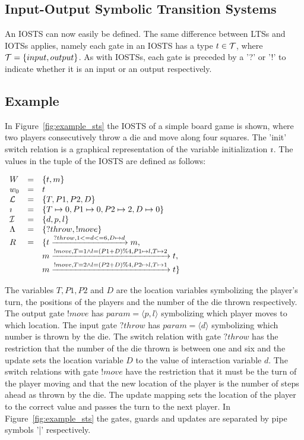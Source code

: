 \subsection{Input-Output Symbolic Transition Systems}
An IOSTS can now easily be defined. The same difference between LTSs and IOTSs applies, namely each gate in an IOSTS has a type $t \in \mathcal{T}$, where $\mathcal{T} = \{input, output\}$. As with IOSTSs, each gate is preceded by a '?' or '!' to indicate whether it is an input or an output respectively.

\subsection{Example}\label{sec:sts_example}
In Figure~\ref{fig:example_sts} the IOSTS of a simple board game is shown, where two players consecutively throw a die and move along four squares. The 'init' switch relation is a graphical representation of the variable initialization $\imath$. The values in the tuple of the IOSTS are defined as follows:

$\begin{array}{lcl}
W & = & \{t, m\} \\
w_0 & = & t \\
\mathcal{L} & = & \{T, P1, P2, D\} \\
\imath & = & \{T \mapsto 0, P1 \mapsto 0, P2 \mapsto 2, D \mapsto 0\} \\
\mathcal{I} & = & \{d, p, l\} \\
\Lambda & = & \{?throw, !move\} \\
R & = & \{t\xrightarrow{?throw, 1 <= d <= 6, D \mapsto d}m, \\
 & & m\xrightarrow{!move, T=1 \land l=(P1+D)\%4, P1 \mapsto l, T \mapsto 2}t, \\
 & & m\xrightarrow{!move, T=2 \land l=(P2+D)\%4, P2 \mapsto l, T \mapsto 1}t\}
\end{array}$

The variables $T, P1, P2$ and $D$ are the location variables symbolizing the player's turn, the positions of the players and the number of the die thrown respectively. The output gate $!move$ has $param = \langle p, l\rangle$ symbolizing which player moves to which location. The input gate $?throw$ has $param = \langle d\rangle$ symbolizing which number is thrown by the die. The switch relation with gate $?throw$ has the restriction that the number of the die thrown is between one and six and the update sets the location variable $D$ to the value of interaction variable $d$. The switch relations with gate $!move$ have the restriction that it must be the turn of the player moving and that the new location of the player is the number of steps ahead as thrown by the die. The update mapping sets the location of the player to the correct value and passes the turn to the next player. In Figure~\ref{fig:example_sts} the gates, guards and updates are separated by pipe symbols '|' respectively.

